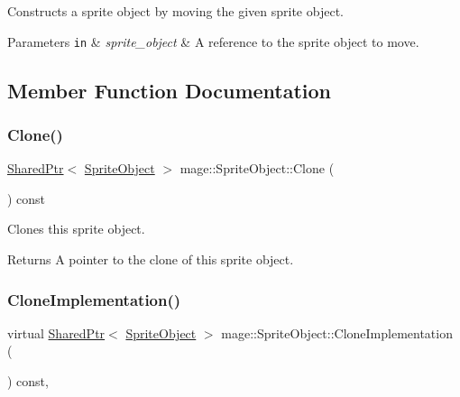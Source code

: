 Constructs a sprite object by moving the given sprite object.


\begin{DoxyParams}[1]{Parameters}
\mbox{\tt in}  & {\em sprite\+\_\+object} & A reference to the sprite object to move. \\
\hline
\end{DoxyParams}


\subsection{Member Function Documentation}
\hypertarget{classmage_1_1_sprite_object_a309befb66869a363a7243b7fe4d32f49}{}\label{classmage_1_1_sprite_object_a309befb66869a363a7243b7fe4d32f49} 
\subsubsection{\texorpdfstring{Clone()}{Clone()}}
{\footnotesize\ttfamily \hyperlink{namespacemage_a1e01ae66713838a7a67d30e44c67703e}{Shared\+Ptr}$<$ \hyperlink{classmage_1_1_sprite_object}{Sprite\+Object} $>$ mage\+::\+Sprite\+Object\+::\+Clone (\begin{DoxyParamCaption}{ }\end{DoxyParamCaption}) const}

Clones this sprite object.

\begin{DoxyReturn}{Returns}
A pointer to the clone of this sprite object. 
\end{DoxyReturn}
\hypertarget{classmage_1_1_sprite_object_a7ae445af224769ee5e69c9468670a03f}{}\label{classmage_1_1_sprite_object_a7ae445af224769ee5e69c9468670a03f} 
\subsubsection{\texorpdfstring{Clone\+Implementation()}{CloneImplementation()}}
{\footnotesize\ttfamily virtual \hyperlink{namespacemage_a1e01ae66713838a7a67d30e44c67703e}{Shared\+Ptr}$<$ \hyperlink{classmage_1_1_sprite_object}{Sprite\+Object} $>$ mage\+::\+Sprite\+Object\+::\+Clone\+Implementation (\begin{DoxyParamCaption}{ }\end{DoxyParamCaption}) const\hspace{0.3cm}{\ttfamily [private]}, {}}

